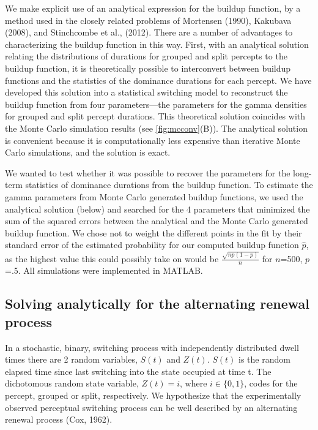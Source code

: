 We make explicit use of an analytical expression for the buildup function, by a method used in the closely related problems of Mortensen (1990), Kakubava (2008), and Stinchcombe et al., (2012). There are a number of advantages to characterizing the buildup function in this way. First, with an analytical solution relating the distributions of durations for grouped and split percepts to the buildup function, it is theoretically possible to interconvert between buildup functions and the statistics of the dominance durations for each percept. We have developed this solution into a statistical switching model to reconstruct the buildup function from four parameters—the parameters for the gamma densities for grouped and split percept durations. This theoretical solution coincides with the Monte Carlo simulation results (see \ref{fig:mcconv}(B)). The analytical solution is convenient because it is computationally less expensive than iterative Monte Carlo simulations, and the solution is exact.

We wanted to test whether it was possible to recover the parameters for the long-term statistics of dominance durations from the buildup function. To estimate the gamma parameters from Monte Carlo generated buildup functions, we used the analytical solution (below) and searched for the 4 parameters that minimized the sum of the squared errors between the analytical and the Monte Carlo generated buildup function. We chose not to weight the different points in the fit by their standard error of the estimated probability for our computed buildup function $\hat{p}$, as the highest value this could possibly take on would be $\frac{\sqrt{np(1-p)}}{n}$ for $n$=500, $p$=.5. All simulations were implemented in MATLAB.

\subsection{Solving analytically for the alternating renewal process}

In a stochastic, binary, switching process with independently distributed dwell times there are 2 random variables, $S(t)$ and $Z(t)$. $S(t)$ is the random elapsed time since last switching into the state occupied at time t. The dichotomous random state variable, $Z(t) =i$, where $i \in \{0,1\}$, codes for the percept, grouped or split, respectively. We hypothesize that the experimentally observed perceptual switching process can be well described by an alternating renewal process (Cox, 1962).

